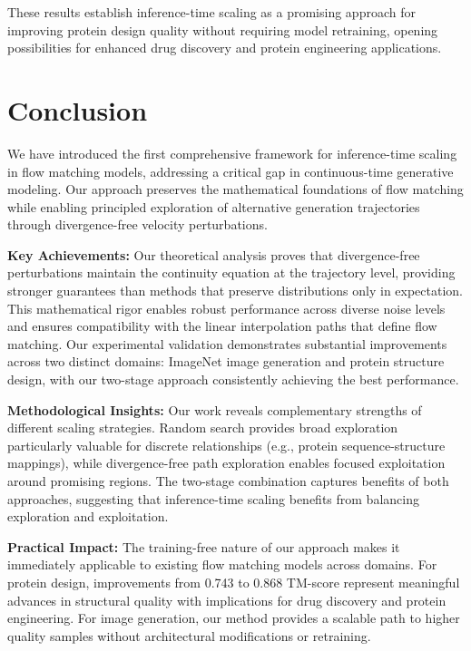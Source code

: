 \documentclass{article}
\begin{document}
These results establish inference-time scaling as a promising approach for improving protein design quality without requiring model retraining, opening possibilities for enhanced drug discovery and protein engineering applications.

\section{Conclusion}

We have introduced the first comprehensive framework for inference-time scaling in flow matching models, addressing a critical gap in continuous-time generative modeling. Our approach preserves the mathematical foundations of flow matching while enabling principled exploration of alternative generation trajectories through divergence-free velocity perturbations.

\textbf{Key Achievements:} Our theoretical analysis proves that divergence-free perturbations maintain the continuity equation at the trajectory level, providing stronger guarantees than methods that preserve distributions only in expectation. This mathematical rigor enables robust performance across diverse noise levels and ensures compatibility with the linear interpolation paths that define flow matching. Our experimental validation demonstrates substantial improvements across two distinct domains: ImageNet image generation and protein structure design, with our two-stage approach consistently achieving the best performance.

\textbf{Methodological Insights:} Our work reveals complementary strengths of different scaling strategies. Random search provides broad exploration particularly valuable for discrete relationships (e.g., protein sequence-structure mappings), while divergence-free path exploration enables focused exploitation around promising regions. The two-stage combination captures benefits of both approaches, suggesting that inference-time scaling benefits from balancing exploration and exploitation.

\textbf{Practical Impact:} The training-free nature of our approach makes it immediately applicable to existing flow matching models across domains. For protein design, improvements from 0.743 to 0.868 TM-score represent meaningful advances in structural quality with implications for drug discovery and protein engineering. For image generation, our method provides a scalable path to higher quality samples without architectural modifications or retraining.
\end{document}
